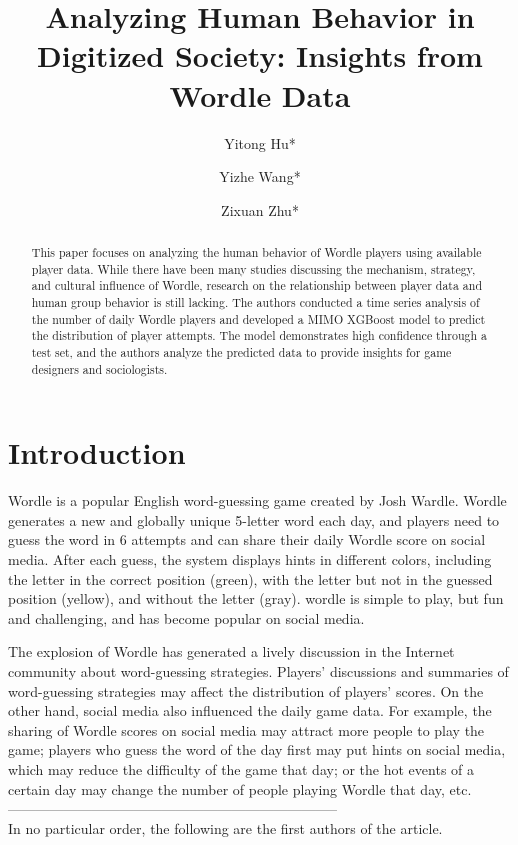 \documentclass[a4paper]{jpconf}
\begin{document}
\title{Analyzing Human Behavior in Digitized Society: Insights from Wordle Data}


\author{Yitong Hu*}

\address{Beijing University of Posts and Telecommunications, Beijing, China}


\author{Yizhe Wang*}

\address{Beijing University of Posts and Telecommunications, Beijing, China}


\author{Zixuan Zhu*}

\address{Beijing University of Posts and Telecommunications, Beijing, China}


\begin{abstract}
This paper focuses on analyzing the human behavior of Wordle players using available player data. While there have been many studies discussing the mechanism, strategy, and cultural influence of Wordle, research on the relationship between player data and human group behavior is still lacking. The authors conducted a time series analysis of the number of daily Wordle players and developed a MIMO XGBoost model to predict the distribution of player attempts. The model demonstrates high confidence through a test set, and the authors analyze the predicted data to provide insights for game designers and sociologists.
\end{abstract}

\section{Introduction}
Wordle is a popular English word-guessing game created by Josh Wardle. Wordle generates a new and globally unique 5-letter word each day, and players need to guess the word in 6 attempts and can share their daily Wordle score on social media. After each guess, the system displays hints in different colors, including the letter in the correct position (green), with the letter but not in the guessed position (yellow), and without the letter (gray). wordle is simple to play, but fun and challenging, and has become popular on social media.

The explosion of Wordle has generated a lively discussion in the Internet community about word-guessing strategies. Players' discussions and summaries of word-guessing strategies may affect the distribution of players' scores. On the other hand, social media also influenced the daily game data. For example, the sharing of Wordle scores on social media may attract more people to play the game; players who guess the word of the day first may put hints on social media, which may reduce the difficulty of the game that day; or the hot events of a certain day may change the number of people playing Wordle that day, etc.\\
-----------------------------------------------------------------------\\
\scriptsize*In no particular order, the following are the first authors of the article.
\normalsize
\end{document}
